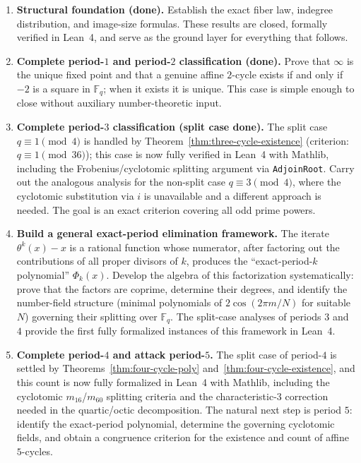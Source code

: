 \documentclass[11pt]{article}
\newcommand{\F}{\mathbb{F}}
\begin{document}
\begin{enumerate}[label=\textbf{Stage \arabic*.}, leftmargin=*, align=left]

\item \textbf{Structural foundation (done).}
Establish the exact fiber law, indegree distribution, and image-size formulas.
These results are closed, formally verified in Lean~4, and serve as the ground layer for everything that follows.

\item \textbf{Complete period-$1$ and period-$2$ classification (done).}
Prove that $\infty$ is the unique fixed point and that a genuine affine $2$-cycle exists if and only if $-2$ is a square in $\F_q$; when it exists it is unique.
This case is simple enough to close without auxiliary number-theoretic input.

\item \textbf{Complete period-$3$ classification (split case done).}
The split case $q\equiv 1\pmod4$ is handled by Theorem~\ref{thm:three-cycle-existence} (criterion: $q\equiv 1\pmod{36}$); this case is now fully verified in Lean~4 with Mathlib, including the Frobenius/cyclotomic splitting argument via \texttt{AdjoinRoot}.
Carry out the analogous analysis for the non-split case $q\equiv 3\pmod4$, where the cyclotomic substitution via $i$ is unavailable and a different approach is needed.
The goal is an exact criterion covering all odd prime powers.

\item \textbf{Build a general exact-period elimination framework.}
The iterate $\theta^k(x)-x$ is a rational function whose numerator, after factoring out the contributions of all proper divisors of $k$, produces the ``exact-period-$k$ polynomial'' $\Phi_k(x)$.
Develop the algebra of this factorization systematically: prove that the factors are coprime, determine their degrees, and identify the number-field structure (minimal polynomials of $2\cos(2\pi m/N)$ for suitable $N$) governing their splitting over $\F_q$.
The split-case analyses of periods $3$ and $4$ provide the first fully formalized instances of this framework in Lean~4.

\item \textbf{Complete period-$4$ and attack period-$5$.}
The split case of period-$4$ is settled by Theorems~\ref{thm:four-cycle-poly} and~\ref{thm:four-cycle-existence}, and this count is now fully formalized in Lean~4 with Mathlib, including the cyclotomic $m_{16}$/$m_{60}$ splitting criteria and the characteristic-$3$ correction needed in the quartic/octic decomposition.
The natural next step is period $5$: identify the exact-period polynomial, determine the governing cyclotomic fields, and obtain a congruence criterion for the existence and count of affine $5$-cycles.


\end{enumerate}
\end{document}
